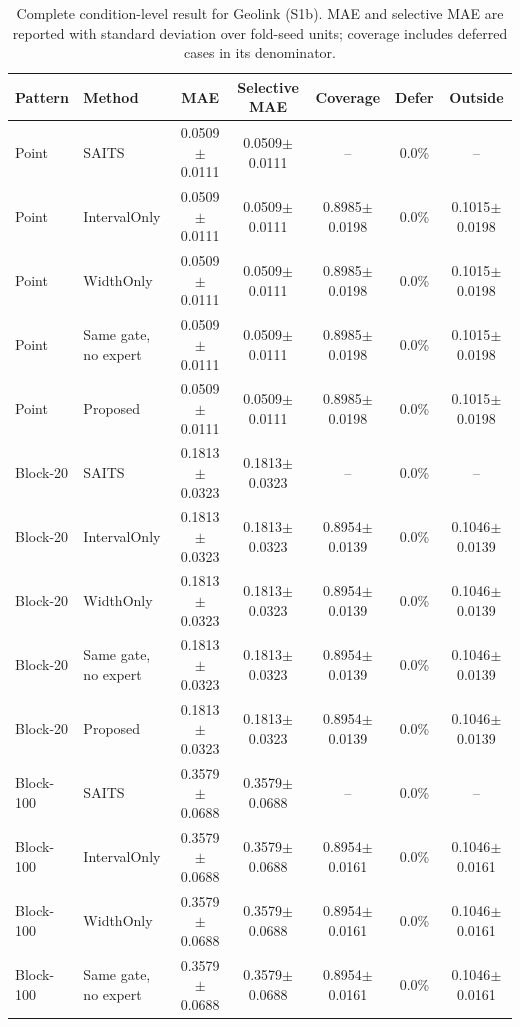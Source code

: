 \begin{table}
\caption{Complete condition-level result for Geolink (S1b).
MAE and selective MAE are reported with standard deviation over fold-seed units;
coverage includes deferred cases in its denominator.}
\label{tab:s1b}
\centering
\scriptsize
\setlength{\tabcolsep}{4pt}
\begin{tabular*}{\textwidth}{@{\extracolsep{\fill}}llccccc@{}}
\toprule
Pattern & Method & MAE & Selective MAE & Coverage & Defer & Outside \\
\midrule
Point & SAITS & 0.0509$\pm$0.0111 & 0.0509$\pm$0.0111 & -- & 0.0\% & -- \\
Point & IntervalOnly & 0.0509$\pm$0.0111 & 0.0509$\pm$0.0111 & 0.8985$\pm$0.0198 & 0.0\% & 0.1015$\pm$0.0198 \\
Point & WidthOnly & 0.0509$\pm$0.0111 & 0.0509$\pm$0.0111 & 0.8985$\pm$0.0198 & 0.0\% & 0.1015$\pm$0.0198 \\
Point & Same gate, no expert & 0.0509$\pm$0.0111 & 0.0509$\pm$0.0111 & 0.8985$\pm$0.0198 & 0.0\% & 0.1015$\pm$0.0198 \\
Point & Proposed & 0.0509$\pm$0.0111 & 0.0509$\pm$0.0111 & 0.8985$\pm$0.0198 & 0.0\% & 0.1015$\pm$0.0198 \\
\addlinespace[1.5pt]
Block-20 & SAITS & 0.1813$\pm$0.0323 & 0.1813$\pm$0.0323 & -- & 0.0\% & -- \\
Block-20 & IntervalOnly & 0.1813$\pm$0.0323 & 0.1813$\pm$0.0323 & 0.8954$\pm$0.0139 & 0.0\% & 0.1046$\pm$0.0139 \\
Block-20 & WidthOnly & 0.1813$\pm$0.0323 & 0.1813$\pm$0.0323 & 0.8954$\pm$0.0139 & 0.0\% & 0.1046$\pm$0.0139 \\
Block-20 & Same gate, no expert & 0.1813$\pm$0.0323 & 0.1813$\pm$0.0323 & 0.8954$\pm$0.0139 & 0.0\% & 0.1046$\pm$0.0139 \\
Block-20 & Proposed & 0.1813$\pm$0.0323 & 0.1813$\pm$0.0323 & 0.8954$\pm$0.0139 & 0.0\% & 0.1046$\pm$0.0139 \\
\addlinespace[1.5pt]
Block-100 & SAITS & 0.3579$\pm$0.0688 & 0.3579$\pm$0.0688 & -- & 0.0\% & -- \\
Block-100 & IntervalOnly & 0.3579$\pm$0.0688 & 0.3579$\pm$0.0688 & 0.8954$\pm$0.0161 & 0.0\% & 0.1046$\pm$0.0161 \\
Block-100 & WidthOnly & 0.3579$\pm$0.0688 & 0.3579$\pm$0.0688 & 0.8954$\pm$0.0161 & 0.0\% & 0.1046$\pm$0.0161 \\
Block-100 & Same gate, no expert & 0.3579$\pm$0.0688 & 0.3579$\pm$0.0688 & 0.8954$\pm$0.0161 & 0.0\% & 0.1046$\pm$0.0161 \\

\end{tabular*}
\end{table}
